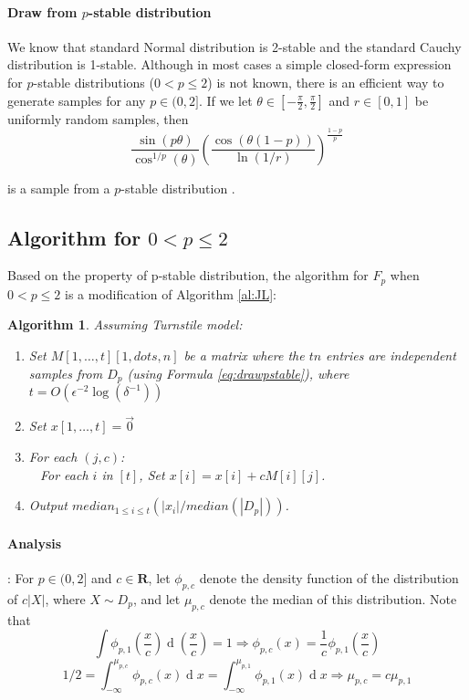 \documentclass[11pt]{article}
\theoremstyle{plain}
\newtheorem{algorithm}{Algorithm}[section]
\begin{document}
\paragraph{Draw from $p$-stable distribution}
We know that standard Normal distribution is 2-stable and the standard 
Cauchy distribution is 1-stable. Although in most cases a simple closed-form 
expression for $p$-stable distributions ($0<p\le 2$) is not known, there is an 
efficient way to generate samples for any $p\in(0,2]$. If we let 
$\theta\in[-\frac{\pi}{2},\frac{\pi}{2}]$ and $r\in[0,1]$ be uniformly random 
samples, then
\begin{equation}
\label{eq:drawpstable}
\frac{\sin(p\theta)}{\cos^{1/p}(\theta)} 
({\frac{\cos(\theta(1-p))}{\ln(1/r)}})^{\frac{1-p}{p}}
\end{equation}

is a sample from a $p$-stable distribution \cite{CMS76}.

\subsection{Algorithm for $0<p\le 2$}
Based on the property of p-stable distribution, the algorithm for $F_p$ when 
$0<p\le 2$ is a modification of Algorithm \ref{al:JL}:

\begin{algorithm}
	\label{al:indykp}
	Assuming Turnstile model:
	\begin{enumerate}
		\item Set $M[1,\dots,t][1,dots,n]$ be a matrix where the $tn$ entries are 
		independent samples from $D_{p}$ (using Formula 
		\ref{eq:drawpstable}), where $t=O(\epsilon^{-2}\log(\delta^{-1}))$
		\item Set $x[1,\dots,t]=\vec{0}$
		\item For each $(j,c)$:\\
		\mbox{	} For each $i$ in $[t]$, Set $x[i]=x[i]+cM[i][j]$.
		\item Output $median_{1\leq i\leq t}(|x_i|/median(|D_p|))$.
	\end{enumerate}
\end{algorithm}

\paragraph{Analysis} :
For $p\in (0,2]$ and $c\in  \mathbf{R}$, let $\phi_{p,c}$ denote the density 
function of the distribution of $c|X|$, where $X\sim D_p$, and let
$\mu_{p,c}$ denote the median of this distribution. Note that
\[
\int \phi_{p,1}(\frac{x}{c})\mathop{d}(\frac{x}{c})  =1 \Rightarrow 
\phi_{p,c}(x)=\frac{1}{c}\phi_{p,1}(\frac{x}{c})
\]
\[
1/2=\int_{-\infty}^{\mu_{p,c}}\phi_{p,c}(x)\mathop{d}x
=\int_{-\infty}^{\mu_{p,1}}\phi_{p,1}(x)\mathop{d}x \Rightarrow 
\mu_{p,c}=c\mu_{p,1}
\]
\end{document}
